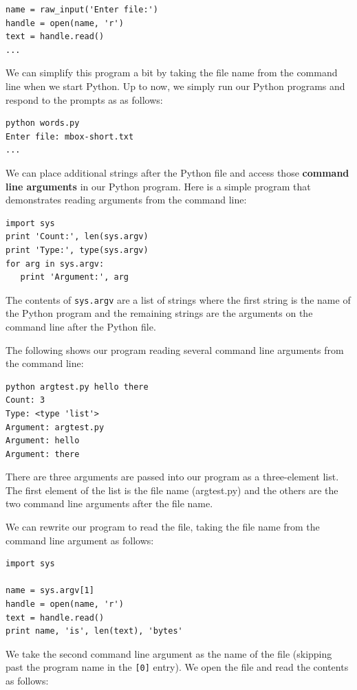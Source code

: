 \documentclass[11pt]{book}
\begin{document}
\beforeverb
\begin{verbatim}
name = raw_input('Enter file:')
handle = open(name, 'r')
text = handle.read()
...
\end{verbatim}
\afterverb
%
We can simplify this program a bit by taking the file name
from the command line when we start Python.  Up to now,
we simply run our Python programs and respond to the 
prompts as as follows:

\beforeverb
\begin{verbatim}
python words.py
Enter file: mbox-short.txt
...
\end{verbatim}
\afterverb
%
We can place additional strings after the Python file and access
those {\bf command line arguments} in our Python program.  Here is a simple program 
that demonstrates reading arguments from the command line:

\beforeverb
\begin{verbatim}
import sys
print 'Count:', len(sys.argv)
print 'Type:', type(sys.argv)
for arg in sys.argv:
   print 'Argument:', arg
\end{verbatim}
\afterverb
%
The contents of {\tt sys.argv} are a list of strings where the first string
is the name of the Python program and the remaining strings are the arguments
on the command line after the Python file.

The following shows our program reading several command line arguments from the command
line:

\beforeverb
\begin{verbatim}
python argtest.py hello there
Count: 3
Type: <type 'list'>
Argument: argtest.py
Argument: hello
Argument: there
\end{verbatim}
\afterverb
%
There are three arguments are passed into our program as a three-element list.  
The first element of the list is the file name (argtest.py) and the others are 
the two command line arguments after the file name.

We can rewrite our program to read the file, taking the file name 
from the command line argument as follows:

\beforeverb
\begin{verbatim}
import sys

name = sys.argv[1]
handle = open(name, 'r')
text = handle.read()
print name, 'is', len(text), 'bytes'
\end{verbatim}
\afterverb
%
We take the second command line argument as the name of the file (skipping past
the program name in the {\tt [0]} entry).  We open the file and read 
the contents as follows:
\end{document}
